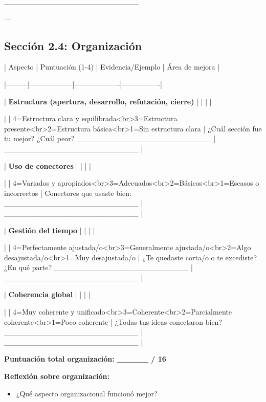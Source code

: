 \documentclass[a4paper,11pt]{article}
\begin{document}
_________________________

\vspace{0.2cm}

---

\vspace{0.2cm}

\subsection{Sección 2.4: Organización}

\vspace{0.2cm}

| Aspecto | Puntuación (1-4) | Evidencia/Ejemplo | Área de mejora |

|---------|------------------|-------------------|----------------|

| \textbf{Estructura (apertura, desarrollo, refutación, cierre)} | | | |

| | 4=Estructura clara y equilibrada<br>3=Estructura presente<br>2=Estructura básica<br>1=Sin estructura clara | ¿Cuál sección fue tu mejor? ¿Cuál peor? _________________________ | _________________________ |

| \textbf{Uso de conectores} | | | |

| | 4=Variados y apropiados<br>3=Adecuados<br>2=Básicos<br>1=Escasos o incorrectos | Conectores que usaste bien: _________________________ | _________________________ |

| \textbf{Gestión del tiempo} | | | |

| | 4=Perfectamente ajustada/o<br>3=Generalmente ajustada/o<br>2=Algo desajustada/o<br>1=Muy desajustada/o | ¿Te quedaste corta/o o te excediste? ¿En qué parte? _________________________ | _________________________ |

| \textbf{Coherencia global} | | | |

| | 4=Muy coherente y unificado<br>3=Coherente<br>2=Parcialmente coherente<br>1=Poco coherente | ¿Todas tus ideas conectaron bien? _________________________ | _________________________ |

\vspace{0.2cm}

\textbf{Puntuación total organización: _____ / 16}

\vspace{0.2cm}

\textbf{Reflexión sobre organización:}

\begin{itemize}

  \item ¿Qué aspecto organizacional funcionó mejor?

\end{itemize}
\end{document}
